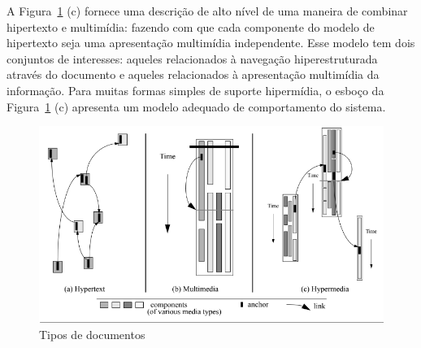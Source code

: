  A Figura~\ref{fig:kindDoc} (c) fornece uma descrição de alto nível de uma maneira de combinar hipertexto e multimídia: fazendo com que cada componente do modelo de hipertexto seja uma apresentação multimídia independente. Esse modelo tem dois conjuntos de interesses: aqueles relacionados à navegação hiperestruturada através do documento e aqueles relacionados à apresentação multimídia da informação. Para muitas formas simples de suporte hipermídia, o esboço da Figura~\ref{fig:kindDoc} (c) apresenta um modelo adequado de comportamento do sistema.

\begin{figure}[!ht]
    \centering
    \includegraphics[scale=0.6,keepaspectratio=true]{figuras/kindsDocuments.png}
    \caption{Tipos de documentos  \cite{Hardman:1994:AHM:175235.175239}}
    \label{fig:kindDoc}
\end{figure}


